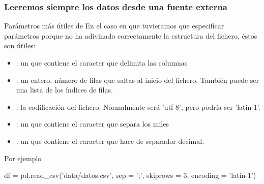 \documentclass[9pt]{beamer}
\begin{document}
\begin{frame}[fragile]
  \frametitle{Leeremos siempre los datos desde una fuente externa}
  \begin{block}{Parámetros más útiles de }
    En el caso en que tuvieramos que especificar parámetros porque  no ha adivinado correctamente la estructura del fichero, éstos son útiles:
    \begin{itemize}
    \item {}: un  que contiene el caracter que delimita las columnas
    \item {}: un entero, número de filas que saltas al inicio del fichero. También puede ser una lista de los índices de filas.
    \item {}: la codificación del fichero. Normalmente será 'utf-8', pero podría ser 'latin-1'.
    \item {}: un  que contiene el caracter que separa los miles
    \item {}: un  que contiene el caracter que hace de separador decimal.
    \end{itemize}
  \end{block}
  \pause
Por ejemplo
\begin{block}{}
  \begin{pyverbatim}
df = pd.read_csv('data/datos.csv', sep = ';', skiprows = 3,
                                             encoding = 'latin-1')
  \end{pyverbatim}
\end{block}
 \end{frame}
\end{document}
